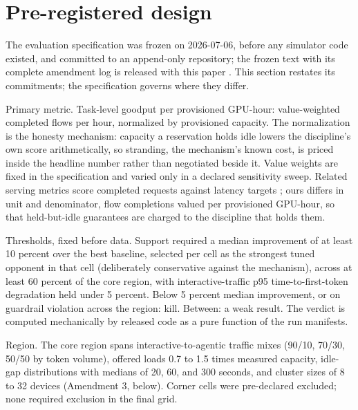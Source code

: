 \section{Pre-registered design}

\begin{table}[tbp]
\centering
\small
\caption{Policy roster and tuned parameters per workload family (corrected-horizon tuning campaign; 8-point equal-budget grids).}
\label{tab:roster}

\end{table}

The evaluation specification was frozen on 2026-07-06, before any simulator
code existed, and committed to an append-only repository; the frozen text
with its complete amendment log is released with this paper \citep{evalspec2026}.
This section restates its commitments; the specification governs where they
differ.

Primary metric. Task-level goodput per provisioned GPU-hour: value-weighted
completed flows per hour, normalized by provisioned capacity. The
normalization is the honesty mechanism: capacity a reservation holds idle
lowers the discipline's own score arithmetically, so stranding, the
mechanism's known cost, is priced inside the headline number rather than
negotiated beside it. Value weights are fixed in the specification and
varied only in a declared sensitivity sweep. Related serving metrics score
completed requests against latency targets \citep{mars2026}; ours differs in unit
and denominator, flow completions valued per provisioned GPU-hour, so that
held-but-idle guarantees are charged to the discipline that holds them.

Thresholds, fixed before data. Support required a median improvement of at
least 10 percent over the best baseline, selected per cell as the strongest
tuned opponent in that cell (deliberately conservative against the
mechanism), across at least 60 percent of the core region, with
interactive-traffic p95 time-to-first-token degradation held under 5
percent. Below 5 percent median improvement, or on guardrail violation
across the region: kill. Between: a weak result. The verdict is computed
mechanically by released code as a pure function of the run manifests.

Region. The core region spans interactive-to-agentic traffic mixes (90/10,
70/30, 50/50 by token volume), offered loads 0.7 to 1.5 times measured
capacity, idle-gap distributions with medians of 20, 60, and 300 seconds,
and cluster sizes of 8 to 32 devices (Amendment 3, below). Corner cells
were pre-declared excluded; none required exclusion in the final grid.

